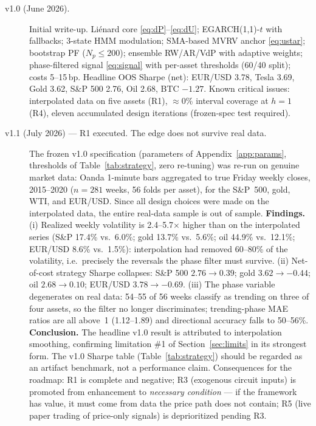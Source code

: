 \documentclass[11pt,a4paper]{article}
\begin{document}
\begin{description}
\item[v1.0 (June 2026).] Initial write-up. Li\'enard core \eqref{eq:dP}--\eqref{eq:dU}; EGARCH(1,1)-$t$ with fallbacks; 3-state HMM modulation; SMA-based MVRV anchor \eqref{eq:ustar}; bootstrap PF ($N_p \le 200$); ensemble RW/AR/VdP with adaptive weights; phase-filtered signal \eqref{eq:signal} with per-asset thresholds (60/40 split); costs 5--15\,bp. Headline OOS Sharpe (net): EUR/USD 3.78, Tesla 3.69, Gold 3.62, S\&P 500 2.76, Oil 2.68, BTC $-1.27$. Known critical issues: interpolated data on five assets (R1), $\approx$0\% interval coverage at $h{=}1$ (R4), eleven accumulated design iterations (frozen-spec test required).
\item[v1.1 (July 2026) --- R1 executed. The edge does not survive real data.] The frozen v1.0 specification (parameters of Appendix~\ref{app:params}, thresholds of Table~\ref{tab:strategy}, zero re-tuning) was re-run on genuine market data: Oanda 1-minute bars aggregated to true Friday weekly closes, 2015--2020 ($n=281$ weeks, 56 folds per asset), for the S\&P~500, gold, WTI, and EUR/USD. Since all design choices were made on the interpolated data, the entire real-data sample is out of sample. \textbf{Findings.} (i) Realized weekly volatility is 2.4--5.7$\times$ higher than on the interpolated series (S\&P 17.4\% vs.\ 6.0\%; gold 13.7\% vs.\ 5.6\%; oil 44.9\% vs.\ 12.1\%; EUR/USD 8.6\% vs.\ 1.5\%): interpolation had removed 60--80\% of the volatility, i.e.\ precisely the reversals the phase filter must survive. (ii) Net-of-cost strategy Sharpe collapses: S\&P 500 $2.76 \to 0.39$; gold $3.62 \to -0.44$; oil $2.68 \to 0.10$; EUR/USD $3.78 \to -0.69$. (iii) The phase variable degenerates on real data: 54--55 of 56 weeks classify as trending on three of four assets, so the filter no longer discriminates; trending-phase MAE ratios are all above~1 (1.12--1.89) and directional accuracy falls to 50--56\%. \textbf{Conclusion.} The headline v1.0 result is attributed to interpolation smoothing, confirming limitation \#1 of Section~\ref{sec:limits} in its strongest form. The v1.0 Sharpe table (Table~\ref{tab:strategy}) should be regarded as an artifact benchmark, not a performance claim. Consequences for the roadmap: R1 is complete and negative; R3 (exogenous circuit inputs) is promoted from enhancement to \emph{necessary condition} --- if the framework has value, it must come from data the price path does not contain; R5 (live paper trading of price-only signals) is deprioritized pending R3.

\end{description}
\end{document}
